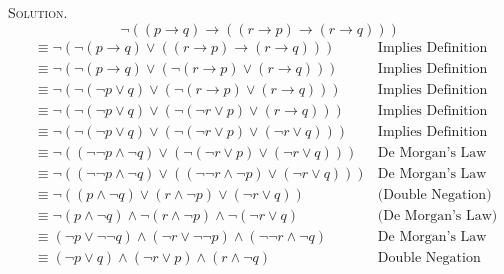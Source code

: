 \documentclass[12pt, a4paper, oneside]{article}
\newenvironment{solution}{\par\noindent\textsc{Solution. }}{\\\par}
\begin{document}
\begin{solution}
\newpage
\begin{equation*}
  \neg \left( \left( p \rightarrow q \right) \rightarrow \left( \left( r \rightarrow p \right) \rightarrow \left( r \rightarrow q \right) \right) \right)
\end{equation*}
\begin{align*}
    &\equiv \neg \left( \neg \left( p \rightarrow q \right) \vee \left( \left( r \rightarrow p \right) \rightarrow \left( r \rightarrow q \right) \right) \right) &\text{Implies Definition} \\
    &\equiv \neg \left( \neg \left( p \rightarrow q \right) \vee \left(\neg \left( r \rightarrow p \right) \vee \left( r \rightarrow q \right) \right) \right) &\text{Implies Definition} \\
    &\equiv \neg \left( \neg \left( \neg p \vee q \right) \vee \left(\neg \left( r \rightarrow p \right) \vee \left( r \rightarrow q \right) \right) \right) &\text{Implies Definition} \\
    &\equiv \neg \left( \neg \left( \neg p \vee q \right) \vee \left(\neg \left(\neg r \vee p \right) \vee \left( r \rightarrow q \right) \right) \right) &\text{Implies Definition} \\
    &\equiv \neg \left( \neg \left( \neg p \vee q \right) \vee \left(\neg \left(\neg r \vee p \right) \vee \left( \neg r \vee q \right) \right) \right) &\text{Implies Definition} \\
    &\equiv \neg \left( \left(\neg \neg p \wedge \neg q \right) \vee \left(\neg \left(\neg r \vee p \right) \vee \left( \neg r \vee q \right) \right) \right) &\text{De Morgan's Law} \\
    &\equiv \neg \left( \left(\neg \neg p \wedge \neg q \right) \vee \left(\left(\neg\neg r \wedge \neg p \right) \vee \left( \neg r \vee q \right) \right) \right) &\text{De Morgan's Law} \\
    &\equiv \neg \left( \left(p \wedge \neg q \right) \vee \left(r \wedge \neg p \right) \vee \left( \neg r \vee q \right) \right)  &\text{(Double Negation)} \\
    &\equiv \neg \left(p \wedge \neg q \right) \wedge \neg \left(r \wedge \neg p \right) \wedge \neg \left( \neg r \vee q \right) &\text{(De Morgan's Law)} \\
    &\equiv \left( \neg p \vee \neg \neg q \right) \wedge \left( \neg r \vee \neg \neg p \right) \wedge \left( \neg \neg r \wedge \neg q \right) &\text{De Morgan's Law} \\
    &\equiv \left( \neg p \vee q \right) \wedge \left( \neg r \vee p \right) \wedge \left(r \wedge \neg q \right) &\text{Double Negation} \\

\end{align*}
\end{solution}
\end{document}
